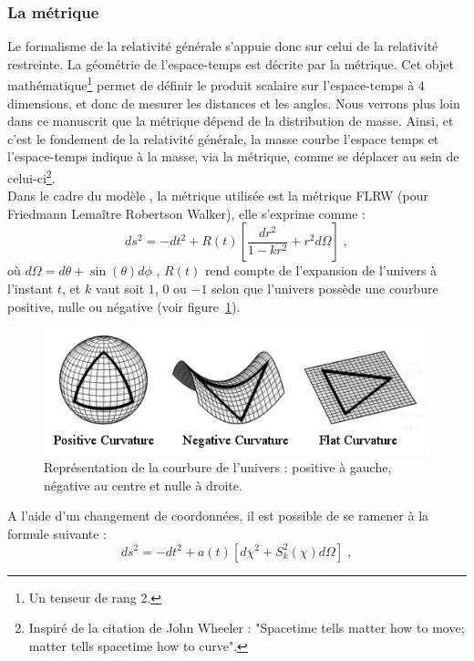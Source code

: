 \subsubsection{La métrique}
Le formalisme de la relativité générale s'appuie donc sur celui de la relativité restreinte. La géométrie de l'espace-temps est décrite par la métrique. Cet objet mathématique\footnote{Un tenseur de rang 2.} permet de définir le produit scalaire sur l'espace-temps à 4 dimensions, et donc de mesurer les distances et les angles.
Nous verrons plus loin dans ce manuscrit que la métrique dépend de la distribution de masse. Ainsi, et c'est le fondement de la relativité générale, la masse courbe l'espace temps et l'espace-temps indique à la masse, via la métrique, comme se déplacer au sein de celui-ci\footnote{Inspiré de la citation de John Wheeler : "Spacetime tells matter how to move; matter tells spacetime how to curve".}. \\
Dans le cadre du modèle \lcdm{}, la métrique utilisée est la métrique FLRW (pour Friedmann Lemaître Robertson Walker), elle s'exprime comme :
\begin{equation}
  \label{eq:metrique1}
  ds^2 = - dt^2 + R(t) \left[ \frac{dr^2}{1 - k r^2} + r^2 d\Omega \right] \; ,
\end{equation}
où $d\Omega = d\theta + \sin(\theta) d\phi$ , $R(t)$ rend compte de l'expansion de l'univers à l'instant $t$, et $k$ vaut soit $1$, $0$ ou $-1$ selon que l'univers possède une courbure positive, nulle ou négative (voir figure~\ref{fig:curvature}).
\begin{figure}
  \centering
  \includegraphics[scale=0.6]{curvature}
  \caption{Représentation de la courbure de l'univers : positive à gauche, négative au centre et nulle à droite.}
  \label{fig:curvature}
\end{figure}
A l'aide d'un changement de coordonnées, il est possible de se ramener à la formule suivante :
\begin{equation}
  \label{eq:metrique2}
  ds^2 = - dt^2 + a(t)\left[ d\chi^2 + S_{k}^2(\chi) d\Omega \right] \; ,
\end{equation}
